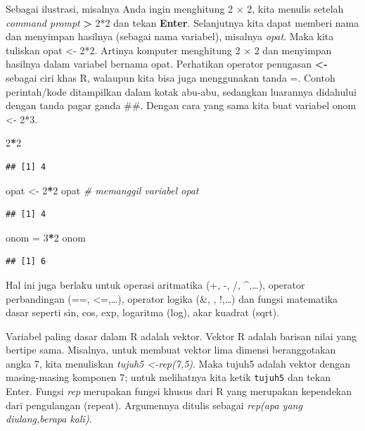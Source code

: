 \documentclass[a4paper, nobind]{templates/ociamthesis}
\newenvironment{Shaded}{\begin{snugshade}}{\end{snugshade}}
\newcommand{\CommentTok}[1]{\textcolor[rgb]{0.56,0.35,0.01}{\textit{#1}}}
\newcommand{\DecValTok}[1]{\textcolor[rgb]{0.00,0.00,0.81}{#1}}
\newcommand{\NormalTok}[1]{#1}
\newcommand{\OtherTok}[1]{\textcolor[rgb]{0.56,0.35,0.01}{#1}}
\newcommand{\SpecialCharTok}[1]{\textcolor[rgb]{0.81,0.36,0.00}{\textbf{#1}}}
\renewenvironment{Shaded}
{
  \vspace{10pt}%
  \begin{snugshade}%
}{%
  \end{snugshade}%
  \vspace{8pt}%
}
\begin{document}
Sebagai ilustrasi, misalnya Anda ingin menghitung 2 × 2, kita menulis setelah \emph{command prompt} \textbf{\textgreater{}} 2*2 dan tekan \textbf{Enter}. Selanjutnya kita dapat memberi nama dan menyimpan hasilnya (sebagai nama variabel), misalnya \emph{opat}. Maka kita tuliskan opat \textless- 2*2. Artinya komputer menghitung 2 × 2 dan menyimpan hasilnya dalam variabel bernama opat. Perhatikan operator penugasan \textbf{\textless-} sebagai ciri khas R, walaupun kita bisa juga menggunakan tanda =. Contoh perintah/kode ditampilkan dalam kotak abu-abu, sedangkan luarannya didahului dengan tanda pagar ganda \#\#. Dengan cara yang sama kita buat variabel onom \textless- 2*3.

\begin{Shaded}
\begin{Highlighting}[]
\DecValTok{2}\SpecialCharTok{*}\DecValTok{2}
\end{Highlighting}
\end{Shaded}

\begin{verbatim}
## [1] 4
\end{verbatim}

\begin{Shaded}
\begin{Highlighting}[]
\NormalTok{opat }\OtherTok{\textless{}{-}} \DecValTok{2}\SpecialCharTok{*}\DecValTok{2}
\NormalTok{opat }\CommentTok{\# memanggil variabel opat}
\end{Highlighting}
\end{Shaded}

\begin{verbatim}
## [1] 4
\end{verbatim}

\begin{Shaded}
\begin{Highlighting}[]
\NormalTok{onom }\OtherTok{=} \DecValTok{3}\SpecialCharTok{*}\DecValTok{2}
\NormalTok{onom}
\end{Highlighting}
\end{Shaded}

\begin{verbatim}
## [1] 6
\end{verbatim}

Hal ini juga berlaku untuk operasi aritmatika (+, -, /, \^{},\ldots), operator perbandingan (==, \textless=,\ldots), operator logika (\&, \textbar, !,\ldots) dan fungsi matematika dasar seperti sin, cos, exp, logaritma (log), akar kuadrat (sqrt).

Variabel paling dasar dalam R adalah vektor. Vektor R adalah barisan nilai yang bertipe sama. Misalnya, untuk membuat vektor lima dimensi beranggotakan angka 7, kita menuliskan \emph{tujuh5 \textless-rep(7,5)}. Maka tujuh5 adalah vektor dengan masing-masing komponen 7; untuk melihatnya kita ketik \texttt{tujuh5} dan tekan Enter. Fungsi \emph{rep} merupakan fungsi khusus dari R yang merupakan kependekan dari pengulangan (repeat). Argumennya ditulis sebagai \emph{rep(apa yang diulang,berapa kali)}.
\end{document}
